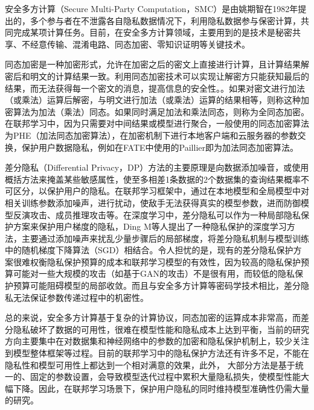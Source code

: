 安全多方计算（Secure Multi-Party Computation，SMC）是由姚期智在1982年提出的，多个参与者在不泄露各自隐私数据情况下，利用隐私数据参与保密计算，共同完成某项计算任务。目前，在安全多方计算领域，主要用到的是技术是秘密共享、不经意传输、混淆电路、同态加密、零知识证明等关键技术。

同态加密是一种加密形式，允许在加密之后的密文上直接进行计算，且计算结果解密后和明文的计算结果一致。利用同态加密技术可以实现让解密方只能获知最后的结果，而无法获得每一个密文的消息，提高信息的安全性。。如果对密文进行加法（或乘法）运算后解密，与明文进行加法（或乘法）运算的结果相等，则称这种加密算法为加法（乘法）同态。如果同时满足加法和乘法同态，则称为全同态加密。在联邦学习中，因为只需要对中间结果或模型进行聚合，一般使用的同态加密算法为PHE（加法同态加密算法），在加密机制下进行本地客户端和云服务器的参数交换，保护用户数据隐私，例如在FATE中使用的Paillier即为加法同态加密算法。

差分隐私（Differential Privacy，DP）方法的主要原理是向数据添加噪音，或使用概括方法来掩盖某些敏感属性，使至多相差1条数据的2个数据集的查询结果概率不可区分，以保护用户的隐私。在联邦学习框架中，通过在本地模型和全局模型中对相关训练参数添加噪声，进行扰动，使敌手无法获得真实的模型参数，进而防御模型反演攻击、成员推理攻击等。在深度学习中，差分隐私可以作为一种局部隐私保护方案来保护用户梯度的隐私，Ding M等人提出了一种隐私保护的深度学习方法，主要通过添加噪声来扰乱少量步骤后的局部梯度，将差分隐私机制与模型训练中的随机梯度下降算法（SGD）相结合。令人担忧的是，现有的差分隐私保护方案很难权衡隐私保护预算的成本和联邦学习模型的有效性，因为较高的隐私保护预算可能对一些大规模的攻击（如基于GAN的攻击）不是很有用，而较低的隐私保护预算可能阻碍模型的局部收敛。而且与安全多方计算等密码学技术相比，差分隐私无法保证参数传递过程中的机密性。

总的来说，安全多方计算基于复杂的计算协议，同态加密的运算成本非常高，而差分隐私破坏了数据的可用性，很难在模型性能和隐私成本上达到平衡，当前的研究方向主要集中在对数据集和神经网络中的参数的加密和隐私保护机制上，较少关注到模型整体框架等过程。目前的联邦学习中的隐私保护方法还有许多不足，不能在隐私性和模型可用性上都达到一个相对满意的效果，此外， 大部分方法是基于统一的、固定的参数设置，会导致模型迭代过程中累积大量隐私损失，使模型性能大幅下降。因此，在联邦学习场景下，保护用户隐私的同时维持模型准确性仍需大量的研究。

